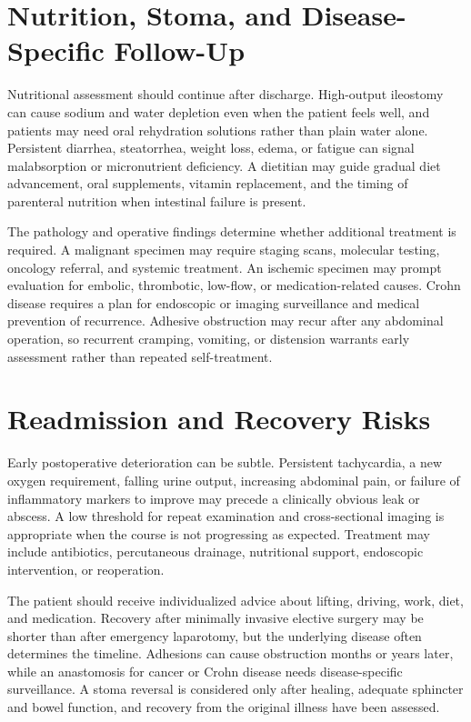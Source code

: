 \section*{Nutrition, Stoma, and Disease-Specific Follow-Up}
Nutritional assessment should continue after discharge. High-output ileostomy can cause sodium and water depletion even when the patient feels well, and patients may need oral rehydration solutions rather than plain water alone. Persistent diarrhea, steatorrhea, weight loss, edema, or fatigue can signal malabsorption or micronutrient deficiency. A dietitian may guide gradual diet advancement, oral supplements, vitamin replacement, and the timing of parenteral nutrition when intestinal failure is present.

The pathology and operative findings determine whether additional treatment is required. A malignant specimen may require staging scans, molecular testing, oncology referral, and systemic treatment. An ischemic specimen may prompt evaluation for embolic, thrombotic, low-flow, or medication-related causes. Crohn disease requires a plan for endoscopic or imaging surveillance and medical prevention of recurrence. Adhesive obstruction may recur after any abdominal operation, so recurrent cramping, vomiting, or distension warrants early assessment rather than repeated self-treatment.

\section*{Readmission and Recovery Risks}
Early postoperative deterioration can be subtle. Persistent tachycardia, a new oxygen requirement, falling urine output, increasing abdominal pain, or failure of inflammatory markers to improve may precede a clinically obvious leak or abscess. A low threshold for repeat examination and cross-sectional imaging is appropriate when the course is not progressing as expected. Treatment may include antibiotics, percutaneous drainage, nutritional support, endoscopic intervention, or reoperation.

The patient should receive individualized advice about lifting, driving, work, diet, and medication. Recovery after minimally invasive elective surgery may be shorter than after emergency laparotomy, but the underlying disease often determines the timeline. Adhesions can cause obstruction months or years later, while an anastomosis for cancer or Crohn disease needs disease-specific surveillance. A stoma reversal is considered only after healing, adequate sphincter and bowel function, and recovery from the original illness have been assessed.

